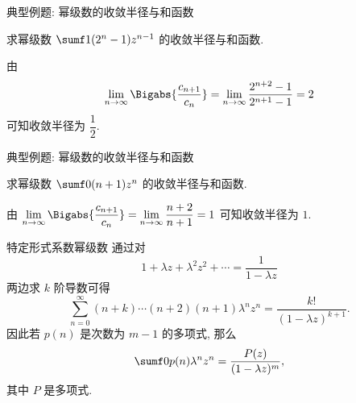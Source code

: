 \begin{frame}{典型例题: 幂级数的收敛半径与和函数}
	\onslide<+->
	\begin{example}[near]
		求幂级数 $\sumf1(2^n-1)z^{n-1}$ 的收敛半径与和函数.
	\end{example}
	\onslide<+->
	\begin{solution}[nearprev]
		由
		\[
			\lim_{n\to\infty}\Bigabs{\frac{c_{n+1}}{c_n}}
			=\lim_{n\to\infty}\frac{2^{n+2}-1}{2^{n+1}-1}=2
		\]
		可知收敛半径为 $\dfrac12$.
		\bigdel
	\end{solution}
\end{frame}


\begin{frame}{典型例题: 幂级数的收敛半径与和函数}
	\onslide<+->
	\begin{example}[nearnext]
		求幂级数 $\sumf0(n+1)z^n$ 的收敛半径与和函数.
	\end{example}
	\onslide<+->
	\begin{solution}[nearprev]
		由 $\displaystyle\lim_{n\to\infty}\Bigabs{\frac{c_{n+1}}{c_n}}=\lim_{n\to\infty}\frac{n+2}{n+1}=1$ 可知收敛半径为 $1$.
		\bigdel
	\end{solution}
\end{frame}


\begin{frame}{特定形式系数幂级数\noexer}
	\onslide<+->
	通过对
	\[
		1+\lambda z+\lambda^2 z^2+\cdots=\dfrac1{1-\lambda z}
	\]
	两边求 $k$ 阶导数可得
	\[
		\sum_{n=0}^{\infty}(n+k)\cdots(n+2)(n+1)\lambda^n z^n
		=\frac{k!}{(1-\lambda z)^{k+1}}.
	\]
	\onslide<+->
	因此若 $p(n)$ 是次数为 $m-1$ 的多项式, 那么
	\[
		\sumf0 p(n)\lambda^n z^n
		=\frac{P(z)}{(1-\lambda z)^{m}},
	\]
	其中 $P$ 是多项式.
\end{frame}



